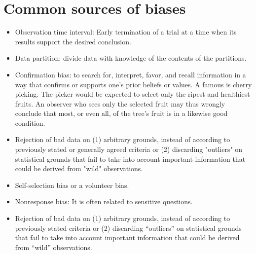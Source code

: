 \hypertarget{data}{%
  \section{Common sources of biases}\label{survival-bias}}
\begin{itemize}
\item Observation time interval: 
Early termination of a trial at a time when its results support the desired conclusion.
\item Data partition: divide data with knowledge of the contents of the partitions. 
\item Confirmation bias: to search for, interpret, favor, and recall information in a way that confirms or supports one's prior beliefs or values. A famous is cherry picking. %
  The picker would be expected to select only the ripest and healthiest fruits. An observer who sees only the selected fruit may thus wrongly conclude that most, or even all, of the tree's fruit is in a likewise good condition.
\item Rejection of bad data on (1) arbitrary grounds, instead of according to previously stated or generally agreed criteria or (2) discarding "outliers" on statistical grounds that fail to take into account important information that could be derived from "wild" observations.
\item Self-selection bias or a volunteer bias.  %
\item Nonresponse bias: It is often related to sensitive questions.
\item Rejection of bad data on (1) arbitrary grounds, instead of according to previously stated criteria or (2) discarding ``outliers'' on statistical grounds that fail to take into account important information that could be derived from ``wild'' observations.

\end{itemize}
